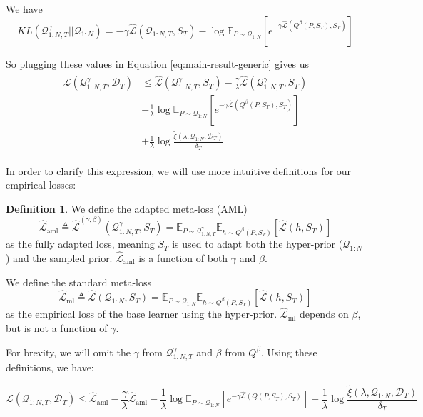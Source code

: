 \documentclass{article}
\theoremstyle{definition}
\newtheorem{defn}{Definition}[section]
\newcommand{\Expect}[2]{\mathbb{E}_{#1}\left [#2 \right ]}
\begin{document}
We have 
$$KL(\mathcal{Q}^{\gamma}_{1:N,T}||\mathcal{Q}_{1:N})=
-\gamma\hat{\mathcal{L}}(\mathcal{Q}_{1:N,T}, S_T)-\log\Expect{P\sim \mathcal{Q}_{1:N}}{e^{-\gamma\hat{\mathcal{L}}(Q^\beta(P,S_T),S_T)}}$$ 

So plugging these values in Equation \ref{eq:main-result-generic} gives us
\begin{align*} 
\begin{split}
\mathcal{L}(\mathcal{Q}^{\gamma}_{1:N,T}, \mathcal{D}_T) & \leq \hat{\mathcal{L}}(\mathcal{Q}^{\gamma}_{1:N,T}, S_T) -\frac{\gamma}{\lambda}\hat{\mathcal{L}}(\mathcal{Q}^{\gamma}_{1:N,T}, S_T) \\ &- \frac{1}{\lambda}\log\Expect{P\sim \mathcal{Q}_{1:N}}{e^{-\gamma\hat{\mathcal{L}}(Q^\beta(P,S_T),S_T)}}\\ &+\frac{1}{\lambda}\log\frac{\tilde{\xi}(\lambda,\mathcal{Q}_{1:N},\mathcal{D}_T)}{\delta_T}
\end{split}
\end{align*}

In order to clarify this expression, we will use more intuitive definitions for our empirical losses:
\begin{defn}
	We define the adapted meta-loss (AML) $$\hat{\mathcal{L}}_{\mathrm{aml}}\triangleq \hat{\mathcal{L}}^{(\gamma,\beta)}(\mathcal{Q}^{\gamma}_{1:N,T}, S_T)=\mathbb{E}_{P\sim \mathcal{Q}^{\gamma}_{1:N,T}}\mathbb{E}_{h\sim Q^{\beta}(P,S_T)}\left [\hat{\mathcal{L}}(h, S_T)\right ]$$ as the fully adapted loss, meaning $S_T$ is used to adapt both the hyper-prior ($\mathcal{Q}_{1:N}$) and the sampled prior. $\hat{\mathcal{L}}_{\mathrm{aml}}$ is a function of both $\gamma$ and $\beta$. 
	
	We define the standard meta-loss $$\hat{\mathcal{L}}_{\mathrm{ml}}\triangleq \hat{\mathcal{L}}(\mathcal{Q}_{1:N}, S_T)=\mathbb{E}_{P\sim \mathcal{Q}_{1:N}}\mathbb{E}_{h\sim Q^{\beta}(P,S_T)}\left [\hat{\mathcal{L}}(h, S_T)\right ]$$ as the empirical loss of the base learner using the hyper-prior. $\hat{\mathcal{L}}_{\mathrm{ml}}$ depends on $\beta$, but is not a function of $\gamma$.
\end{defn}

For brevity, we will omit the $\gamma$ from $\mathcal{Q}^{\gamma}_{1:N,T}$ and $\beta$ from $Q^{\beta}$. Using these definitions, we have:

$$\mathcal{L}(\mathcal{Q}_{1:N,T}, \mathcal{D}_T) \leq \hat{\mathcal{L}}_{\mathrm{aml}} -\frac{\gamma}{\lambda}\hat{\mathcal{L}}_{\mathrm{aml}} - \frac{1}{\lambda}\log \mathbb{E}_{P\sim \mathcal{Q}_{1:N}}\left [e^{-\gamma\hat{\mathcal{L}}(Q(P,S_T),S_T)}\right ]+\frac{1}{\lambda}\log\frac{\tilde{\xi}(\lambda,\mathcal{Q}_{1:N},\mathcal{D}_T)}{\delta_T}$$
\end{document}
